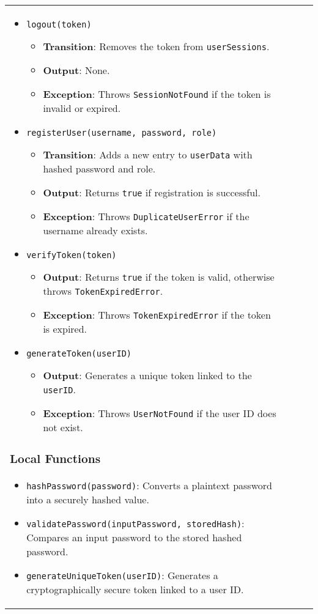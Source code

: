 \documentclass[12pt, titlepage]{article}
\begin{document}
\begin{center}
\begin{tabular}{|p{3cm}|p{4cm}|p{4cm}|p{4cm}|}
\begin{itemize}
\begin{itemize}
    \item \texttt{logout(token)}
    \begin{itemize}
        \item \textbf{Transition}: Removes the token from \texttt{userSessions}.
        \item \textbf{Output}: None.
        \item \textbf{Exception}: Throws \texttt{SessionNotFound} if the token is invalid or expired.
    \end{itemize}

    \item \texttt{registerUser(username, password, role)}
    \begin{itemize}
        \item \textbf{Transition}: Adds a new entry to \texttt{userData} with hashed password and role.
        \item \textbf{Output}: Returns \texttt{true} if registration is successful.
        \item \textbf{Exception}: Throws \texttt{DuplicateUserError} if the username already exists.
    \end{itemize}

    \item \texttt{verifyToken(token)}
    \begin{itemize}
        \item \textbf{Output}: Returns \texttt{true} if the token is valid, otherwise throws \texttt{TokenExpiredError}.
        \item \textbf{Exception}: Throws \texttt{TokenExpiredError} if the token is expired.
    \end{itemize}

    \item \texttt{generateToken(userID)}
    \begin{itemize}
        \item \textbf{Output}: Generates a unique token linked to the \texttt{userID}.
        \item \textbf{Exception}: Throws \texttt{UserNotFound} if the user ID does not exist.
    \end{itemize}
\end{itemize}

\subsubsection{Local Functions}

\begin{itemize}
    \item \texttt{hashPassword(password)}: Converts a plaintext password into a securely hashed value.
    \item \texttt{validatePassword(inputPassword, storedHash)}: Compares an input password to the stored hashed password.
    \item \texttt{generateUniqueToken(userID)}: Generates a cryptographically secure token linked to a user ID.
\end{itemize}


\end{itemize}
\end{tabular}
\end{center}
\end{document}
